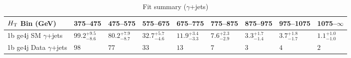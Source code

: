 \documentclass[8pt]{article}
\def\scalht{\mbox{$H_{\rm{T}}$}\xspace}
\newcommand\T{\rule{0pt}{2.6ex}}
\begin{document}
\begin{table}[ht!]
\caption{Fit summary ($\gamma$+jets)}
\label{tab:ensemble-summary}
\centering
\begin{tabular}{ lllllllll }

\hline
\scalht Bin (GeV)       & 375--475                       & 475--575                       & 575--675                       & 675--775                       & 775--875                       & 875--975                       & 975--1075                      & 1075--$\infty$                 \\ [1.000000ex]
\hline
1b ge4j SM $\gamma$+jets\T & $99.2^{+9.5}_{-8.6}$           & $80.2^{+7.9}_{-8.7}$           & $32.7^{+5.7}_{-4.6}$           & $11.9^{+3.4}_{-3.3}$           & $7.6^{+2.3}_{-2.9}$            & $3.3^{+1.7}_{-1.4}$            & $3.7^{+1.8}_{-1.7}$            & $1.1^{+1.0}_{-1.0}$            \\ 
1b ge4j Data $\gamma$+jets\T & $98$                           & $77$                           & $33$                           & $13$                           & $7$                            & $3$                            & $4$                            & $2$                            \\ 
\hline

\end{tabular}
\end{table}
\end{document}
